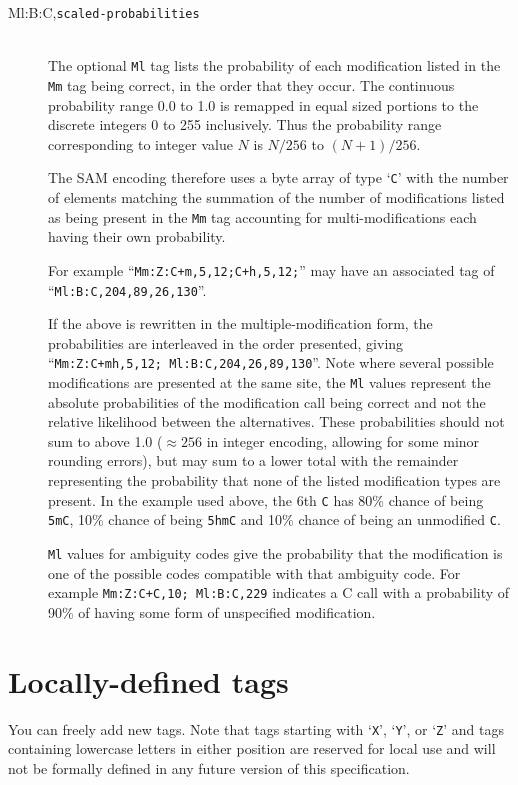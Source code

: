\documentclass[10pt]{article}
\newcommand{\tagvalue}[1]{{\tt #1}}
\begin{document}
\begin{description}
\item[Ml:B:C,\tagvalue{scaled-probabilities}]
\hfill\\
The optional {\tt Ml} tag lists the probability of each modification listed in the {\tt Mm} tag being correct, in the order that they occur.
The continuous probability range 0.0 to 1.0 is remapped in equal
sized portions to the discrete integers 0 to 255 inclusively. Thus the
probability range corresponding to integer value $N$ is $N/256$ to
$(N+1)/256$.

The SAM encoding therefore uses a byte array of type `{\tt C}' with the number of elements matching the summation of the number of modifications listed as being present in the {\tt Mm} tag accounting for multi-modifications each having their own probability.

For example ``{\tt Mm:Z:C+m,5,12;C+h,5,12;}'' may have an associated tag of ``{\tt Ml:B:C,204,89,26,130}''.

If the above is rewritten in the multiple-modification form, the probabilities are interleaved in the order presented, giving ``{\tt Mm:Z:C+mh,5,12;  Ml:B:C,204,26,89,130}''.
Note where several possible modifications are presented at the same site, the {\tt Ml} values represent the absolute probabilities of the modification call being correct and not the relative likelihood between the alternatives.
These probabilities should not sum to above 1.0 ($\approx 256$ in integer encoding, allowing for some minor rounding errors), but may sum to a lower total with the remainder representing the probability that none of the listed modification types are present.
In the example used above, the 6th {\tt C} has 80\% chance of being {\tt 5mC}, 10\% chance of being {\tt 5hmC} and 10\% chance of being an unmodified {\tt C}.

{\tt Ml} values for ambiguity codes give the probability that the modification is one of the possible codes compatible with that ambiguity code.
For example {\tt Mm:Z:C+C,10; Ml:B:C,229} indicates a C call with a probability of 90\% of having some form of unspecified modification.

\end{description}


\section{Locally-defined tags}

You can freely add new tags.
Note that tags starting with `{\tt X}', `{\tt Y}', or `{\tt Z}' and tags
containing lowercase letters in either position are reserved for local use
and will not be formally defined in any future version of this specification.
\end{document}
